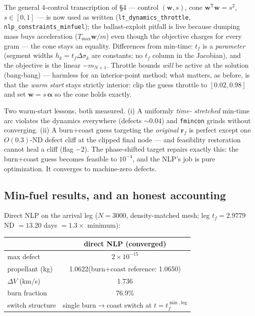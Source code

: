 \documentclass[11pt,letterpaper]{article}
\theoremstyle{noteplain}
\newcommand{\T}{^{\mathsf{T}}}
\newcommand{\rvec}{\mathbf{r}}
\newcommand{\code}[1]{\texttt{#1}}
\begin{document}
The general 4-control transcription of \S4 --- control
$(\mathbf w, s)$, cone $\mathbf w\T\mathbf w = s^2$, $s \in [0,1]$ ---
is now used as written (\code{lt\_dynamics\_throttle},
\code{nlp\_constraints\_minfuel}); the ballast-exploit pitfall is live
because dumping mass buys acceleration ($T_{\max}\mathbf w/m$) even
though the objective charges for every gram --- the cone stays an
equality. Differences from min-time: $t_f$
is a \emph{parameter} (segment widths $h_k = t_f\Delta\sigma_k$ are
constants; no $t_f$ column in the Jacobian), and the objective is the
linear $-m_{N+1}$. Throttle bounds \emph{will} be active at the solution
(bang-bang) --- harmless for an interior-point method; what matters, as
before, is that the \emph{warm start} stays strictly interior: clip the
guess throttle to $[0.02, 0.98]$ and set $\mathbf w = s\,\bm\alpha$ so
the cone holds exactly.

Two warm-start lessons, both measured. (i) A uniformly \emph{time-
stretched} min-time arc violates the dynamics everywhere (defects
$\sim 0.04$) and \code{fmincon} grinds without converging. (ii) A
burn+coast guess targeting the \emph{original} $\rvec_f$ is perfect
except one $O(0.3)$-ND defect cliff at the clipped final node --- and
feasibility restoration cannot heal a cliff (flag $-2$). The phase-shifted
target repairs exactly this: the burn+coast guess becomes feasible to
$10^{-4}$, and the NLP's job is pure optimization. It converges to
machine-zero defects.

\subsection*{Min-fuel results, and an honest accounting}

Direct NLP on the arrival leg ($N = 3000$, density-matched mesh; leg
$t_f = 2.9779$ ND $= 13.20$ days $= 1.3\times$ minimum):

\begin{center}
\begin{tabular}{lc}
\toprule
 & direct NLP (converged) \\
\midrule
max defect            & $2\times10^{-15}$ \\
propellant (kg)       & 1.0622\quad(burn+coast reference: 1.0650) \\
$\Delta V$ (km/s)     & 1.736 \\
burn fraction         & 76.9\% \\
switch structure      & single burn$\to$coast switch at $t = t_f^{\min,\mathrm{leg}}$ \\
\bottomrule
\end{tabular}
\end{center}
\end{document}
